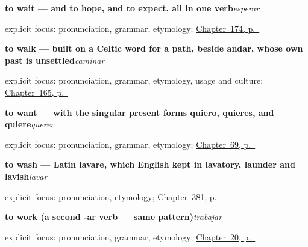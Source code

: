 \noindent\begin{minipage}[t]{\linewidth}
\raggedright
\textbf{to wait — and to hope, and to expect, all in one verb}\enspace\emph{esperar}\par
\footnotesize explicit focus: pronunciation, grammar, etymology; \hyperref[ch:spanish-wait-answer-buy]{Chapter~174, p.~\pageref*{ch:spanish-wait-answer-buy}}
\end{minipage}\par\smallskip

\noindent\begin{minipage}[t]{\linewidth}
\raggedright
\textbf{to walk — built on a Celtic word for a path, beside andar, whose own past is unsettled}\enspace\emph{caminar}\par
\footnotesize explicit focus: pronunciation, grammar, etymology, usage and culture; \hyperref[ch:spanish-hear-sleep-walk-run]{Chapter~165, p.~\pageref*{ch:spanish-hear-sleep-walk-run}}
\end{minipage}\par\smallskip

\noindent\begin{minipage}[t]{\linewidth}
\raggedright
\textbf{to want — with the singular present forms quiero, quieres, and quiere}\enspace\emph{querer}\par
\footnotesize explicit focus: pronunciation, grammar, etymology; \hyperref[ch:stem-changes]{Chapter~69, p.~\pageref*{ch:stem-changes}}
\end{minipage}\par\smallskip

\noindent\begin{minipage}[t]{\linewidth}
\raggedright
\textbf{to wash — Latin lavare, which English kept in lavatory, launder and lavish}\enspace\emph{lavar}\par
\footnotesize explicit focus: pronunciation, etymology; \hyperref[ch:lavar-y-romper]{Chapter~381, p.~\pageref*{ch:lavar-y-romper}}
\end{minipage}\par\smallskip

\noindent\begin{minipage}[t]{\linewidth}
\raggedright
\textbf{to work (a second -ar verb — same pattern)}\enspace\emph{trabajar}\par
\footnotesize explicit focus: pronunciation, grammar, etymology; \hyperref[ch:spanish-trabajar]{Chapter~20, p.~\pageref*{ch:spanish-trabajar}}
\end{minipage}\par\smallskip


